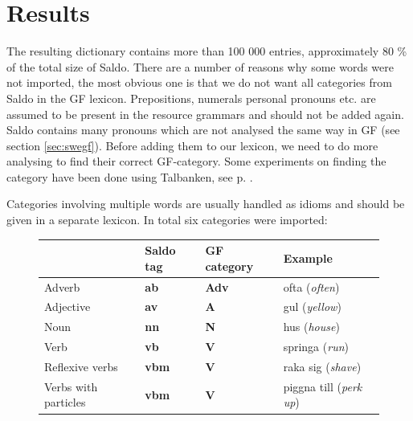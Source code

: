 \documentclass{report}
\begin{document}


\section{Results}
\label{sec:saldoRes}
The resulting dictionary contains more than 100 000 entries, approximately 80 \% 
of the total size of Saldo.
There are a number of reasons why some words were not imported,
the most obvious one is that we do not want all categories from
Saldo in the GF lexicon. Prepositions, %
numerals %
personal pronouns etc.
are assumed to be present in the resource grammars and should not be added again.
Saldo contains many pronouns which
are not analysed the same way in GF (see section \ref{sec:swegf}).
Before adding them to our lexicon, we need to do more analysing to find their correct GF-category.
Some experiments on finding the category
have been done using Talbanken, see p. \pageref{sec:gf.quant}.

Categories involving multiple words %
are usually handled as idioms and should be given in a separate lexicon. In
total six categories were imported: \\

\begin{figure}[h]
\begin{tabular}{|l|lll|}
\hline
& Saldo tag & GF category & Example \\
\hline
 Adverb & \textbf{ab} &\textbf{Adv} & ofta (\emph{often})\\
 Adjective&\textbf{av} &    \textbf{A} & gul (\emph{yellow})\\
 Noun & \textbf{nn} &\textbf{N} & hus (\emph{house})\\
 Verb & \textbf{vb} &\textbf{V} & springa (\emph{run})\\
 Reflexive verbs  &\textbf{vbm}& \textbf{V} & raka sig (\emph{shave})\\
 Verbs with particles &\textbf{vbm}& \textbf{V}  &  piggna till (\emph{perk up})\\
\hline
\end{tabular}
\caption{}
\end{figure}
\end{document}
